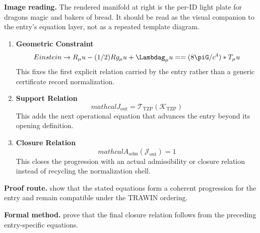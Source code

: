 \begin{samepage}
\noindent\begin{minipage}[t]{0.45\linewidth}
\vspace{0pt}
\raggedright
\scriptsize\textbf{Image reading.} The rendered manifold at right is the per-ID light plate for dragons magic and bakers of bread. It should be read as the visual companion to the entry's equation layer, not as a repeated template diagram.\par
\end{minipage}\hfill
\begin{minipage}[t]{0.53\linewidth}
\vspace*{-0.10in}
\raggedright
{}
\end{minipage}
\end{samepage}

\clearpage


\begin{enumerate}[leftmargin=1.6em,itemsep=9pt,topsep=6pt]
\item \textbf{Geometric Constraint}
\[
Einstein \to R_\mu u - (1/2)Rg_\mu u + \Lambdag_\mu u == (8\piG/c^4)*T_\mu u
\]
This fixes the first explicit relation carried by the entry rather than a generic certificate record normalization.

\item \textbf{Support Relation}
\[
mathcal{J}_{\mathrm{out}} = \mathcal{T}_{\mathrm{TZP}}\!\left(\mathcal{K}_{\mathrm{TZP}}\right)
\]
This adds the next operational equation that advances the entry beyond its opening definition.

\item \textbf{Closure Relation}
\[
mathcal{A}_{\mathrm{adm}}\!\left(\mathcal{J}_{\mathrm{out}}\right)=1
\]
This closes the progression with an actual admissibility or closure relation instead of recycling the normalization shell.
\end{enumerate}

\textbf{Proof route.} show that the stated equations form a coherent progression for the entry and remain compatible under the TRAWIN ordering.

\textbf{Formal method.} prove that the final closure relation follows from the preceding entry-specific equations.

\medskip
{}

